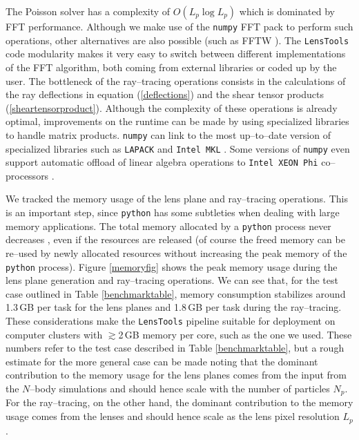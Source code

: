 \documentclass[5p]{elsarticle}
\newcommand{\ttt}[1]{\texttt{#1}}
\newcommand{\LT}{\texttt{LensTools} }
\begin{document}
The Poisson solver has a complexity of $O(L_p\log{L_p})$ which is dominated by FFT performance. Although we make use of the \ttt{numpy} FFT pack \citep{scipy} to perform such operations, other alternatives are also possible (such as FFTW \citep{FFTW05}). The \LT code modularity makes it very easy to switch between different implementations of the FFT algorithm, both coming from external libraries or coded up by the user. 
The bottleneck of the ray--tracing operations consists in the calculations of the ray deflections in equation (\ref{deflections}) and the shear tensor products (\ref{sheartensorproduct}). Although the complexity of these operations is already optimal, improvements on the runtime can be made by using specialized libraries to handle matrix products. \ttt{numpy} can link to the most up--to--date version of specialized libraries such as \ttt{LAPACK} \citep{lapack} and \ttt{Intel MKL} \citep{intel-mkl}. Some versions of \ttt{numpy} even support automatic offload of linear algebra operations to \ttt{Intel XEON Phi} co--processors \citep{xeonphi}.     

We tracked the memory usage of the lens plane and ray--tracing operations. This is an important step, since \ttt{python} has some subtleties when dealing with large memory applications. The total memory allocated by a \ttt{python} process never decreases \citep{python}, even if the resources are released (of course the freed memory can be re--used by newly allocated resources without increasing the peak memory of the \ttt{python} process). Figure \ref{memoryfig} shows the peak memory usage during the lens plane generation and ray--tracing operations. We can see that, for the test case outlined in Table \ref{benchmarktable}, memory consumption stabilizes around 1.3\,GB per task for the lens planes and 1.8\,GB per task during the ray--tracing. These considerations make the \LT pipeline suitable for deployment on computer clusters with $\gtrsim$2\,GB memory per core, such as the one we used. These numbers refer to the test case described in Table \ref{benchmarktable}, but a rough estimate for the more general case can be made noting that the dominant contribution to the memory usage for the lens planes comes from the input from the $N$--body simulations and should hence scale with the number of particles $N_p$. For the ray--tracing, on the other hand, the dominant contribution to the memory usage comes from the lenses and should hence scale as the lens pixel resolution $L_p$.      
\end{document}
